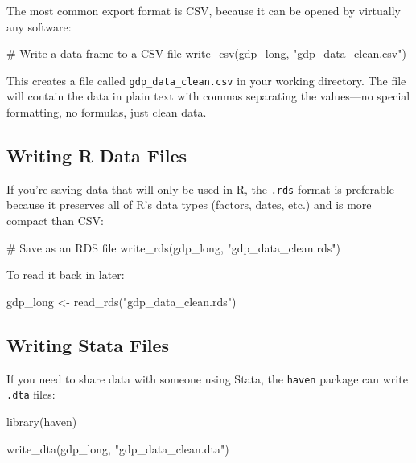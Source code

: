 \documentclass[
  letterpaper,
  DIV=11,
  numbers=noendperiod]{scrreprt}
\newenvironment{Shaded}{\begin{snugshade}}{\end{snugshade}}
\newcommand{\CommentTok}[1]{\textcolor[rgb]{0.37,0.37,0.37}{#1}}
\newcommand{\FunctionTok}[1]{\textcolor[rgb]{0.28,0.35,0.67}{#1}}
\newcommand{\NormalTok}[1]{\textcolor[rgb]{0.00,0.23,0.31}{#1}}
\newcommand{\OtherTok}[1]{\textcolor[rgb]{0.00,0.23,0.31}{#1}}
\newcommand{\StringTok}[1]{\textcolor[rgb]{0.13,0.47,0.30}{#1}}
\begin{document}
The most common export format is CSV, because it can be opened by
virtually any software:

\begin{Shaded}
\begin{Highlighting}[]
\CommentTok{\# Write a data frame to a CSV file}
\FunctionTok{write\_csv}\NormalTok{(gdp\_long, }\StringTok{"gdp\_data\_clean.csv"}\NormalTok{)}
\end{Highlighting}
\end{Shaded}

This creates a file called \texttt{gdp\_data\_clean.csv} in your working
directory. The file will contain the data in plain text with commas
separating the values---no special formatting, no formulas, just clean
data.

\subsection{Writing R Data Files}\label{writing-r-data-files}

If you're saving data that will only be used in R, the \texttt{.rds}
format is preferable because it preserves all of R's data types
(factors, dates, etc.) and is more compact than CSV:

\begin{Shaded}
\begin{Highlighting}[]
\CommentTok{\# Save as an RDS file}
\FunctionTok{write\_rds}\NormalTok{(gdp\_long, }\StringTok{"gdp\_data\_clean.rds"}\NormalTok{)}
\end{Highlighting}
\end{Shaded}

To read it back in later:

\begin{Shaded}
\begin{Highlighting}[]
\NormalTok{gdp\_long }\OtherTok{\textless{}{-}} \FunctionTok{read\_rds}\NormalTok{(}\StringTok{"gdp\_data\_clean.rds"}\NormalTok{)}
\end{Highlighting}
\end{Shaded}

\subsection{Writing Stata Files}\label{writing-stata-files}

If you need to share data with someone using Stata, the \texttt{haven}
package can write \texttt{.dta} files:

\begin{Shaded}
\begin{Highlighting}[]
\FunctionTok{library}\NormalTok{(haven)}

\FunctionTok{write\_dta}\NormalTok{(gdp\_long, }\StringTok{"gdp\_data\_clean.dta"}\NormalTok{)}
\end{Highlighting}
\end{Shaded}
\end{document}
